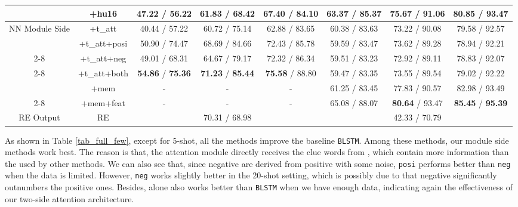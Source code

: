 \begin{table*}
{\begin{tabular}{|c|c|c|c|c|c|c|c|}
\rowcolor{Gray} \multirow{-2}{*}{Output Side}& +hu16 & 47.22 / 56.22 & 61.83 / 68.42 & 67.40 / 84.10
& 63.37 / 85.37 & 75.67 / 91.06 & 80.85 / 93.47  \\
\hline
\multirow{2}{*}{\vspace{-2.2em}NN Module Side} & +t\_att & 40.44 / 57.22 & 60.72 / 75.14 & 62.88 / 83.65
& 60.38 / 83.63 & 73.22 / 90.08 & 79.58 / 92.57  \\
\cline{2-8}
& +t\_att+posi & 50.90 / 74.47 & 68.69 / 84.66 & 72.43 / 85.78
& 59.59 / 83.47 & 73.62 / 89.28 & 78.94 / 92.21 \\
\cline{2-8}
& +t\_att+neg & 49.01 / 68.31 & 64.67 / 79.17 & 72.32 / 86.34
& 59.51 / 83.23 & 72.92 / 89.11 & 78.83 / 92.07 \\
\cline{2-8}
& +t\_att+both & \textbf{54.86} / \textbf{75.36} & \textbf{71.23} / \textbf{85.44} & \textbf{75.58} / 88.80
& 59.47 / 83.35 & 73.55 / 89.54 & 79.02 / 92.22 \\
\hline
\rowcolor{Gray} & +mem & - & - & - & 61.25 / 83.45 & 77.83 / 90.57 & 82.98 / 93.49 \\
\cline{2-8}
\rowcolor{Gray} \multirow{-2}{*}{Few-Shot Model}  & +mem+feat & - & - & - & 65.08 / 88.07 & \textbf{80.64} / 93.47 & \textbf{85.45} / \textbf{95.39} \\
\hline
\hline
RE Output & RE & \multicolumn{3}{|c|}{70.31 / 68.98} & \multicolumn{3}{|c|}{42.33 / 70.79} \\
\hline
\end{tabular}
}
\caption{Results on Full Few-Shot Learning Setting.}
\label{tab_full_few}
\end{table*}

As shown in Table \ref{tab_full_few}, except for 5-shot, all the methods improve the baseline \texttt{BLSTM}.
Among these methods, our \NN module side methods work best.
The reason is that, the attention module directly receives the clue words from \REs, which contain more information than the \REtag used by other methods.
We can also see that, since negative \REs are derived from positive \REs with some noise, \texttt{posi} performs better than \texttt{neg} when the data is limited.
However, \texttt{neg} works slightly better in the 20-shot setting, which is possibly due to that negative \REs significantly outnumbers the positive ones.
Besides, \tatt alone also works better than \texttt{BLSTM} when we have enough data, indicating again the effectiveness of our two-side attention architecture.

